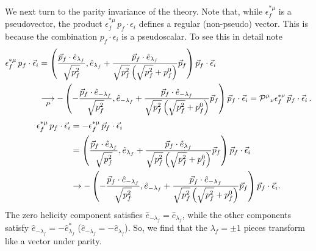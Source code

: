 {\mh 
We next turn to the parity invariance of the theory. Note that, while $\epsilon_f^{*\mu}$ is a pseudovector, the product $\epsilon_f^{*\mu}\, p_f\cdot \epsilon_i$ defines a regular (non-pseudo) vector. This is because the combination $ p_f\cdot \epsilon_i$ is a pseudoscalar. %
To see this in detail note
 \begin{align}
\epsilon_f^{*\mu}\, p_f\cdot \vec{\epsilon}_i & =
\left(\frac{\vec{p}_f\cdot\hat{e}_{\lambda_f}}{\sqrt{p^2_f}},\hat{e}_{\lambda_f}+\frac{\vec{p}_f\cdot\hat{e}_{\lambda_f}}{\sqrt{p^2_f}\left(\sqrt{p^2_f}+p^0_f\right)}\vec{p}_f\right)
\vec{p}_f \cdot\vec{\epsilon}_i
\nonumber\\
& \underset{P}{\longrightarrow}
-
\left(-\frac{\vec{p}_f\cdot\hat{e}_{-\lambda_f}}{\sqrt{p^2_f}},\hat{e}_{-\lambda_f}+\frac{\vec{p}_f\cdot\hat{e}_{-\lambda_f}}{\sqrt{p^2_f}\left(\sqrt{p^2_f}+p^0_f\right)}\vec{p}_f\right)
\vec{p}_f \cdot \vec{\epsilon}_i = {{\mathcal P^\mu}_\nu } \epsilon_f^{*\nu}\, \vec{p}_f \cdot\vec{\epsilon}_i \,.
\end{align}
}
{\raul \begin{align}
\epsilon_f^{*\mu}\, p_f\cdot \vec{\epsilon}_i
&=
-\epsilon_f^{*\mu}\, \vec{p}_f \cdot\vec{\epsilon}_i\nonumber\\
&=
\left(\frac{\vec{p}_f\cdot\hat{e}_{\lambda_f}}{\sqrt{p^2_f}},\hat{e}_{\lambda_f}+\frac{\vec{p}_f\cdot\hat{e}_{\lambda_f}}{\sqrt{p^2_f}\left(\sqrt{p^2_f}+p^0_f\right)}\vec{p}_f\right)
\vec{p}_f \cdot\vec{\epsilon}_i
\nonumber\\
&\to
-
\left(-\frac{\vec{p}_f\cdot\hat{e}_{-\lambda_f}}{\sqrt{p^2_f}},\hat{e}_{-\lambda_f}+\frac{\vec{p}_f\cdot\hat{e}_{-\lambda_f}}{\sqrt{p^2_f}\left(\sqrt{p^2_f}+p^0_f\right)}\vec{p}_f\right)
\vec{p}_f \cdot \vec{\epsilon}_i.
\end{align}}
The zero helicity component satisfies $\hat{e}_{-\lambda_f}=\hat{e}_{\lambda_f}$, while the other components satisfy {\mh $\hat{e}_{-\lambda_f}=-\hat{e}^*_{\lambda_f}$} ({\raul $\hat{e}_{-\lambda_f}=-\hat{e}_{\lambda_f}$}). So, we find that the $\lambda_f=\pm 1$ pieces transform like a vector under parity.  {}

